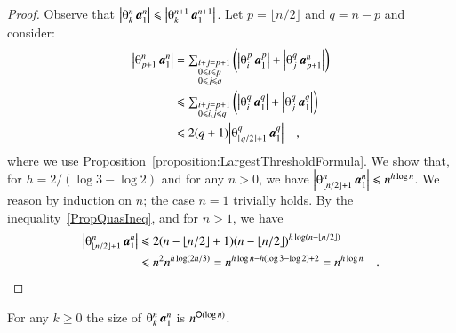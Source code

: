 \begin{proof}
Observe that $\size{\th kn\avec1n}\le\size{\th k{n+1}\avec1{n+1}}$. Let $p=\lfloor n/2\rfloor$ and $q=n-p$ and consider:
\begin{equation}\label{PropQuasIneq}
\begin{split}
\size{\th{p+1}n\avec1n}
&=\textstyle\sum_{\begin{subarray}{l}i+j=p+1    \\
                                     0\le i\le p\\
                                     0\le j\le q
                  \end{subarray}}
  \left(\size{\th ip\avec1p}+
        \size{\th jq\avec{p+1}n}\right)             \\
&\le\textstyle\sum_{\begin{subarray}{l}i+j=p+1\\
                                       0\le i,j\le q
                    \end{subarray}}
  \left(\size{\th iq\avec1q}+
        \size{\th jq\avec1q}\right)                 \\
&\le2(q+1)
  \size{\th{\lfloor q/2\rfloor+1}q\avec1q}\quad,
\end{split}
\end{equation}
where we use Proposition~\vref{proposition:LargestThresholdFormula}. We show that, for $h=2/(\log3-\log2)$ and for any $n>0$, we have $\size{\th{\lfloor n/2\rfloor+1}n\avec1n}\le n^{h\log n}$. We reason by induction on $n$; the case $n=1$ trivially holds. By the inequality~\eqref{PropQuasIneq}, and for $n>1$, we have
\begin{equation*}
\begin{split}
\size{\th{\lfloor n/2\rfloor+1}n\avec1n}
&\le2(n-\lfloor n/2\rfloor+1)
     (n-\lfloor n/2\rfloor)^{h\log(n-\lfloor n/2\rfloor)}       \\
&\le n^2n^{h\log(2n/3)}=n^{h\log n-h(\log3-\log2)+2}=n^{h\log n}
\quad.
\end{split}
\end{equation*}
\end{proof}

\begin{theorem}\label{theorem:SizeThreshold}
For any $k\ge0$ the size of\/ $\th kn\avec1n$ is $n^{{\mathsf O}(\log n)}$.
\end{theorem}

